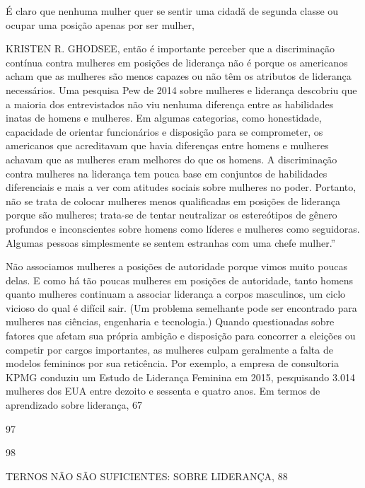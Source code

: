  \par 
É claro que nenhuma mulher quer se sentir uma cidadã de segunda classe ou ocupar uma posição apenas por ser mulher,
 \par 
KRISTEN R. GHODSEE, então é importante perceber que a discriminação contínua contra mulheres em posições de liderança não é porque os americanos acham que as mulheres são menos capazes ou não têm os atributos de liderança necessários. Uma pesquisa Pew de 2014 sobre mulheres e liderança descobriu que a maioria dos entrevistados não viu nenhuma diferença entre as habilidades inatas de homens e mulheres. Em algumas categorias, como honestidade, capacidade de orientar funcionários e disposição para se comprometer, os americanos que acreditavam que havia diferenças entre homens e mulheres achavam que as mulheres eram melhores do que os homens. A discriminação contra mulheres na liderança tem pouca base em conjuntos de habilidades diferenciais e mais a ver com atitudes sociais sobre mulheres no poder. Portanto, não se trata de colocar mulheres menos qualificadas em posições de liderança porque são mulheres; trata-se de tentar neutralizar os estereótipos de gênero profundos e inconscientes sobre homens como líderes e mulheres como seguidoras. Algumas pessoas simplesmente se sentem estranhas com uma chefe mulher.”
 \par 
Não associamos mulheres a posições de autoridade porque vimos muito poucas delas. E como há tão poucas mulheres em posições de autoridade, tanto homens quanto mulheres continuam a associar liderança a corpos masculinos, um ciclo vicioso do qual é difícil sair. (Um problema semelhante pode ser encontrado para mulheres nas ciências, engenharia e tecnologia.) Quando questionadas sobre fatores que afetam sua própria ambição e disposição para concorrer a eleições ou competir por cargos importantes, as mulheres culpam geralmente a falta de modelos femininos por sua reticência. Por exemplo, a empresa de consultoria KPMG conduziu um Estudo de Liderança Feminina em 2015, pesquisando {\color{blue}3}.{\color{blue}014} mulheres dos EUA entre dezoito e sessenta e quatro anos. Em termos de aprendizado sobre liderança, 67%
 \par 
97
 \par 
98
 \par 
TERNOS NÃO SÃO SUFICIENTES: SOBRE LIDERANÇA, 88%
